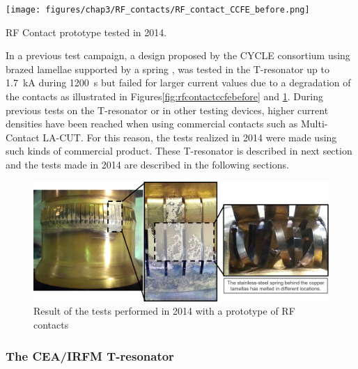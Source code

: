 {\begin{marginfigure}
	\centering
	\texttt{[image: figures/chap3/RF\_contacts/RF\_contact\_CCFE\_before.png]}
	\caption{RF Contact prototype tested in 2014.}
	\label{fig:rfcontactccfebefore}
\end{marginfigure}

In a previous test campaign, a design proposed by the CYCLE consortium using brazed lamellae supported by a spring \cite{argouarch2014}, was tested in the T-resonator up to 1.7~kA during 1200~s but failed for larger current values due to a degradation of the contacts as illustrated in Figures\ref{fig:rfcontactccfebefore} and \ref{fig:rfcontactccfe}\cite{hillairet2015-1}. During previous tests on the T-resonator or in other testing devices, higher current densities have been reached when using commercial contacts such as Multi-Contact LA-CUT\cite{argouarch2013}. For this reason, the tests realized in 2014 were made using such kinds of commercial product. These T-resonator is described in next section and the tests made in 2014 are described in the following sections.

\begin{figure}[h]
	\centering
	\includegraphics[width=1.0\linewidth]{figures/chap3/RF_contacts/RF_contact_CCFE}
	\caption{Result of the tests performed in 2014 with a prototype of RF contacts}
	\label{fig:rfcontactccfe}
\end{figure}


\subsubsection{The CEA/IRFM T-resonator}

}
